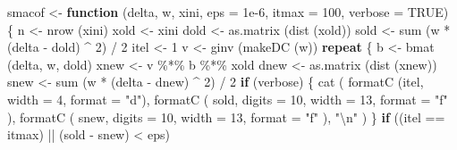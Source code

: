 \documentclass[
  12pt,
  letterpaper,
  DIV=11,
  numbers=noendperiod]{scrreprt}
\newenvironment{Shaded}{\begin{snugshade}}{\end{snugshade}}
\newcommand{\AttributeTok}[1]{\textcolor[rgb]{0.40,0.45,0.13}{#1}}
\newcommand{\ConstantTok}[1]{\textcolor[rgb]{0.56,0.35,0.01}{#1}}
\newcommand{\ControlFlowTok}[1]{\textcolor[rgb]{0.00,0.23,0.31}{\textbf{#1}}}
\newcommand{\DecValTok}[1]{\textcolor[rgb]{0.68,0.00,0.00}{#1}}
\newcommand{\FloatTok}[1]{\textcolor[rgb]{0.68,0.00,0.00}{#1}}
\newcommand{\FunctionTok}[1]{\textcolor[rgb]{0.28,0.35,0.67}{#1}}
\newcommand{\NormalTok}[1]{\textcolor[rgb]{0.00,0.23,0.31}{#1}}
\newcommand{\OtherTok}[1]{\textcolor[rgb]{0.00,0.23,0.31}{#1}}
\newcommand{\SpecialCharTok}[1]{\textcolor[rgb]{0.37,0.37,0.37}{#1}}
\newcommand{\StringTok}[1]{\textcolor[rgb]{0.13,0.47,0.30}{#1}}
\theoremstyle{remark}
\begin{document}
\begin{Shaded}
\begin{Highlighting}[]
\NormalTok{smacof }\OtherTok{\textless{}{-}}
  \ControlFlowTok{function}\NormalTok{ (delta,}
\NormalTok{            w,}
\NormalTok{            xini,}
            \AttributeTok{eps =} \FloatTok{1e{-}6}\NormalTok{,}
            \AttributeTok{itmax =} \DecValTok{100}\NormalTok{,}
            \AttributeTok{verbose =} \ConstantTok{TRUE}\NormalTok{) \{}
\NormalTok{    n }\OtherTok{\textless{}{-}} \FunctionTok{nrow}\NormalTok{ (xini)}
\NormalTok{    xold }\OtherTok{\textless{}{-}}\NormalTok{ xini}
\NormalTok{    dold }\OtherTok{\textless{}{-}} \FunctionTok{as.matrix}\NormalTok{ (}\FunctionTok{dist}\NormalTok{ (xold))}
\NormalTok{    sold }\OtherTok{\textless{}{-}} \FunctionTok{sum}\NormalTok{ (w }\SpecialCharTok{*}\NormalTok{ (delta }\SpecialCharTok{{-}}\NormalTok{ dold) }\SpecialCharTok{\^{}} \DecValTok{2}\NormalTok{) }\SpecialCharTok{/} \DecValTok{2}
\NormalTok{    itel }\OtherTok{\textless{}{-}} \DecValTok{1}
\NormalTok{    v }\OtherTok{\textless{}{-}} \FunctionTok{ginv}\NormalTok{ (}\FunctionTok{makeDC}\NormalTok{ (w))}
    \ControlFlowTok{repeat}\NormalTok{ \{}
\NormalTok{      b }\OtherTok{\textless{}{-}} \FunctionTok{bmat}\NormalTok{ (delta, w, dold)}
\NormalTok{      xnew }\OtherTok{\textless{}{-}}\NormalTok{ v }\SpecialCharTok{\%*\%}\NormalTok{ b }\SpecialCharTok{\%*\%}\NormalTok{ xold}
\NormalTok{      dnew }\OtherTok{\textless{}{-}} \FunctionTok{as.matrix}\NormalTok{ (}\FunctionTok{dist}\NormalTok{ (xnew))}
\NormalTok{      snew }\OtherTok{\textless{}{-}} \FunctionTok{sum}\NormalTok{ (w }\SpecialCharTok{*}\NormalTok{ (delta }\SpecialCharTok{{-}}\NormalTok{ dnew) }\SpecialCharTok{\^{}} \DecValTok{2}\NormalTok{) }\SpecialCharTok{/} \DecValTok{2}
      \ControlFlowTok{if}\NormalTok{ (verbose) \{}
        \FunctionTok{cat}\NormalTok{ (}
          \FunctionTok{formatC}\NormalTok{ (itel, }\AttributeTok{width =} \DecValTok{4}\NormalTok{, }\AttributeTok{format =} \StringTok{"d"}\NormalTok{),}
          \FunctionTok{formatC}\NormalTok{ (}
\NormalTok{            sold,}
            \AttributeTok{digits =} \DecValTok{10}\NormalTok{,}
            \AttributeTok{width =} \DecValTok{13}\NormalTok{,}
            \AttributeTok{format =} \StringTok{"f"}
\NormalTok{          ),}
          \FunctionTok{formatC}\NormalTok{ (}
\NormalTok{            snew,}
            \AttributeTok{digits =} \DecValTok{10}\NormalTok{,}
            \AttributeTok{width =} \DecValTok{13}\NormalTok{,}
            \AttributeTok{format =} \StringTok{"f"}
\NormalTok{          ),}
          \StringTok{"}\SpecialCharTok{\textbackslash{}n}\StringTok{"}
\NormalTok{        )}
\NormalTok{      \}}
      \ControlFlowTok{if}\NormalTok{ ((itel }\SpecialCharTok{==}\NormalTok{ itmax) }\SpecialCharTok{||}\NormalTok{ (sold }\SpecialCharTok{{-}}\NormalTok{ snew) }\SpecialCharTok{\textless{}}\NormalTok{ eps)}

\end{Highlighting}
\end{Shaded}
\end{document}
